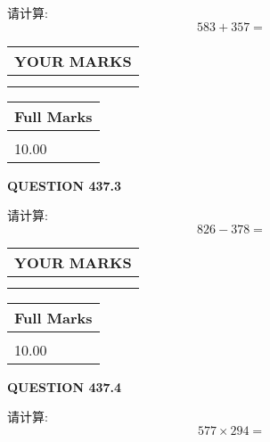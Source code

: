 \documentclass{ctexart}
\begin{document}
  
 
请计算:
\begin{equation}
583 +  %
357 = \nonumber
\end{equation}
 

 

 
  
\vspace{0.2in}
  
\noindent\begin{tabular}{|l|}
\hline
 YOUR MARKS  \\
\hline
 \\ 
 \\ 
\hline
\end{tabular}
\hspace{0.05in} \begin{tabular}{|l|}
\hline
 Full Marks  \\
\hline
 \\ 
10.00 \\
\hline
\end{tabular}
{\textbf{\Large{QUESTION
437.3 
}}}
  
  
 
请计算:
\begin{equation}
826 -   %
378 = \nonumber
\end{equation}
 

 

 
  
\vspace{0.2in}
  
\noindent\begin{tabular}{|l|}
\hline
 YOUR MARKS  \\
\hline
 \\ 
 \\ 
\hline
\end{tabular}
\hspace{0.05in} \begin{tabular}{|l|}
\hline
 Full Marks  \\
\hline
 \\ 
10.00 \\
\hline
\end{tabular}
{\textbf{\Large{QUESTION
437.4 
}}}
  
  
 
请计算:
\begin{equation}
577  \times    %
294 = \nonumber
\end{equation}
 

 

 
  
\vspace{0.2in}
  
\end{document}
